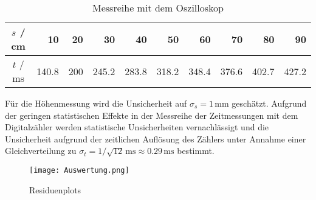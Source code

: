 \documentclass[a4paper, 12pt]{scrartcl}
\begin{document}
\begin{table}[h]
\begin{center}
\begin{tabular}{c|r|r|r|r|r|r|r|r|r}
$s$ / cm & 10 & 20 & 30 & 40 & 50 & 60 & 70 & 80 & 90 \\
\hline
$t$ / ms & 140.8 & 200 & 245.2 & 283.8 & 318.2 & 348.4 & 376.6 & 402.7 & 427.2 \\
\end{tabular}
\caption{Messreihe mit dem Oszilloskop}
\end{center}
\end{table}

Für die Höhenmessung wird die Unsicherheit auf $\sigma_s = 1 \, \mathrm{mm}$ geschätzt. Aufgrund der geringen statistischen Effekte in der Messreihe der Zeitmessungen mit dem Digitalzähler werden statistische Unsicherheiten vernachlässigt und die Unsicherheit aufgrund der zeitlichen Auflösung des Zählers unter Annahme einer Gleichverteilung zu $\sigma_t = 1/\sqrt{12} \, \mathrm{ms} \approx 0.29 \, \mathrm{ms}$ bestimmt.


\begin{figure}[h]
	\centering
	\texttt{[image: Auswertung.png]}
	\caption{Residuenplots}
\end{figure}



\end{document}
